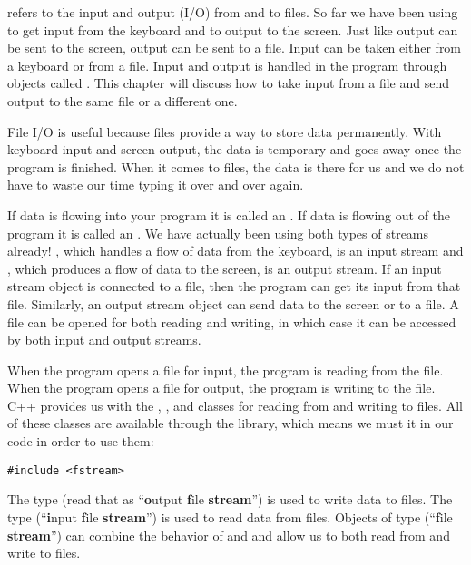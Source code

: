 
 refers to the input and output (I/O) from and to files. 
So far we have been using  to get input from the keyboard and  to output to the screen. 
Just like output can be sent to the screen, output can be sent to a file. 
Input can be taken either from a keyboard or from a file. 
Input and output is handled in the program through objects called . 
This chapter will discuss how to take input from a file and send output to the same file or a different one. 

File I/O is useful because files provide a way to store data permanently. 
With keyboard input and screen output, the data is temporary and goes away once the program is finished.
When it comes to files, the data is there for us and we do not have to waste our time typing it over and over again. 


If data is flowing into your program it is called an . 
If data is flowing out of the program it is called an . 
We have actually been using both types of streams already! 
, which handles a flow of data from the keyboard, is an input stream and , which produces a flow of data to the screen, is an output stream. 
If an input stream object is connected to a file, then the program can get its input from that file. 
Similarly, an output stream object can send data to the screen or to a file. 
A file can be opened for both reading and writing, in which case it can be accessed by both input and output streams.


When the program opens a file for input, the program is reading from the file. 
When the program opens a file for output, the program is writing to the file. 
C++ provides us with the , , and  classes for reading from and writing to files. 
All of these classes are available through the  library, which means we must  it in our code in order to use them:

\begin{lstlisting}
#include <fstream>
\end{lstlisting}

The  type (read that as ``\textbf{o}utput \textbf{f}ile \textbf{stream}'') is used to write data to files. 
The  type (``\textbf{i}nput \textbf{f}ile \textbf{stream}'') is used to read data from files. 
Objects of type  (``\textbf{f}ile \textbf{stream}'') can combine the behavior of  and  and allow us to both read from and write to files.


